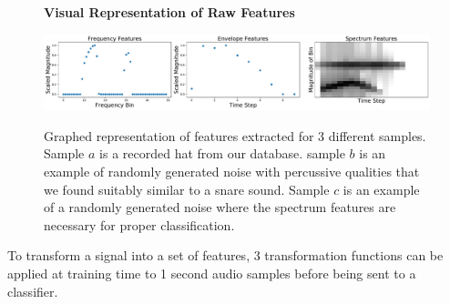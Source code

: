 \documentclass[\main/thesis.tex]{subfiles}
\begin{document}
\begin{figure}
\centering
\textbf{Visual Representation of Raw Features}\par\medskip
    { \includegraphics[width=1\columnwidth]{images/ff3.pdf}}
\caption{Graphed representation of features extracted for 3 different samples. Sample $a$ is a recorded hat from our database. sample $b$ is an example of randomly generated noise with percussive qualities that we found suitably similar to a snare sound. Sample $c$ is an example of a randomly generated noise where the spectrum features are necessary for proper classification.}
\label{fig:stackspectrums}
\end{figure}



To transform a signal into a set of features, 3 transformation functions can be applied at training time to 1 second audio samples before being sent to a classifier.
\end{document}
